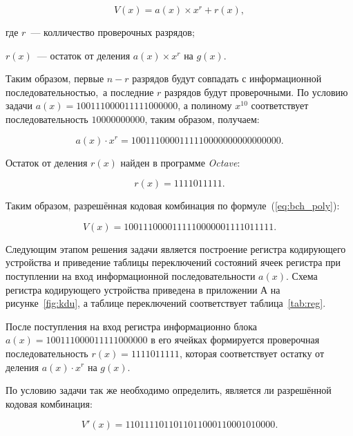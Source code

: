 \begin{equation}
  \label{eq:bch_poly}
  V(x) = a(x) \times x^r + r(x),
\end{equation}


\begin{ESKDexplanation}
\item[где ] $r$~--- колличество проверочных разрядов;
\item $r(x)$~--- остаток от деления $a(x) \times x^r$ на $g(x)$.
\end{ESKDexplanation}

Таким образом, первые $n-r$ разрядов будут совпадать с информационной
последовательностью,~а последние $r$ разрядов будут проверочными. По
условию задачи $a(x) = 100111000011111000000$, а полиному $x^{10}$
соответствует последовательность $10000000000$, таким образом,
получаем:

\begin{equation*}
  a(x) \cdot x^r = 1001110000111110000000000000000.
\end{equation*}

Остаток от деления $r(x)$ найден в программе \textit{Octave}:

\begin{equation*}
r(x) = 1111011111.
\end{equation*}


Таким образом, разрешённая кодовая комбинация по
формуле~(\ref{eq:bch_poly}):

\begin{equation*}
  V(x) = 1001110000111110000001111011111.
\end{equation*}

Следующим этапом решения задачи является построение регистра
кодирующего устройства и приведение таблицы переключений состояний
ячеек регистра при поступлении на вход информационной
последовательности $a(x)$. Схема регистра кодирующего устройства
приведена в приложении А на рисунке~\ref{fig:kdu}, а таблице
переключений соответствует таблица~\ref{tab:reg}.

После поступления на вход регистра информационно блока $a(x) =
100111000011111000000$ в его ячейках формируется проверочная
последовательность $r(x) = 1111011111$, которая соответствует остатку от
деления $a(x) \cdot x^r$ на $g(x)$.

По условию задачи так же необходимо определить, является ли разрешённой
кодовая комбинация:

\begin{equation*}
  V'(x) = 1101111011011011000110001010000.
\end{equation*}

